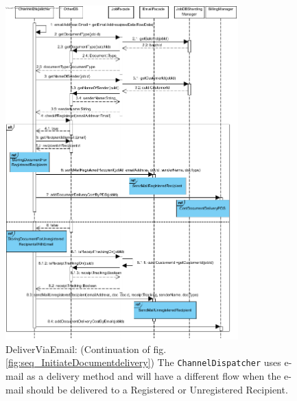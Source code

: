 \documentclass[a4paper,10pt]{article}
\begin{document}
\begin{figure}[!htp]
    \centering
    \includegraphics[width=0.8\textwidth]{DeliverViaEmail.png}
    \caption{DeliverViaEmail: (Continuation of  fig. \ref{fig:seq_InitiateDocumentdelivery}) The  \texttt{ChannelDispatcher} uses e-mail as a delivery method and will have a different flow when the e-mail should be delivered to a Registered or Unregistered Recipient.
        }\label{fig:seq_DeliverViaEmail}
\end{figure}
\end{document}
